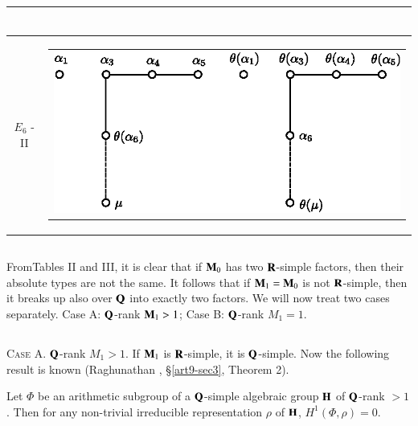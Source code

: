 {\begin{longtable}{@{}|c|c|@{}}
\begin{tabular}{c}
\end{tabular}\\\hline
$E_6$ - II &
\begin{tabular}{c}
{\includegraphics[scale=0.8]{307e.eps}}
\end{tabular}\\\hline
\end{longtable}
}\relax

\setcounter{subsection}{20}
\subsection{}\label{art9-subsec5.21}
From\pageoriginale Tables II and III, it is clear that if $\mathbf{M}_0$ has two $\mathbf{R}$-simple factors, then their absolute types are not the same. It follows that if $\mathbf{M}_1 = \mathbf{M}_0$ is not $\mathbf{R}$-simple, then it breaks up also over $\mathbf{Q}$ into exactly two factors. We will now treat two cases separately. Case A: $\mathbf{Q}$-rank $\mathbf{M}_1 > 1$; Case B: $\mathbf{Q}$-rank $M_1 = 1$.

\subsection{}\label{art9-subsec5.22}
\textsc{Case A.} $\mathbf{Q}$-rank $M_1 > 1$. If $\mathbf{M}_1$ is $\mathbf{R}$-simple, it is $\mathbf{Q}$-simple. Now the following result is known (Raghunathan \cite{art9-key2}, \S \ref{art9-sec3}, Theorem 2).

Let $\Phi$ be an arithmetic subgroup of a $\mathbf{Q}$-simple algebraic group $\mathbf{H}$ of $\mathbf{Q}$-rank $>1$. Then for any non-trivial irreducible representation $\rho$ of $\mathbf{H}$, $H^1 (\Phi, \rho) =0$.

